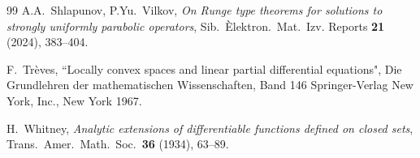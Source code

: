 \documentclass[10pt,leqno]{amsart}
\theoremstyle{definition}
\begin{document}
{\begin{thebibliography}{99}
A.A.~Shlapunov, P.Yu.~Vilkov, 
\emph{On Runge type theorems for solutions to strongly uniformly parabolic operators},
Sib.~\`Elektron.~Mat.~Izv. Reports {\bf 21} (2024), 383--404.

F.~Tr\`eves,
``Locally convex spaces and linear partial differential equations",
Die Grundlehren der mathematischen Wissenschaften, Band 146 Springer-Verlag New York, Inc., New York 1967.

H.~Whitney,
\emph{Analytic extensions of differentiable functions defined on closed sets},
Trans.~Amer.~Math.~Soc.~{\bf 36} (1934), 63--89.

\end{thebibliography}
}
\end{document}
